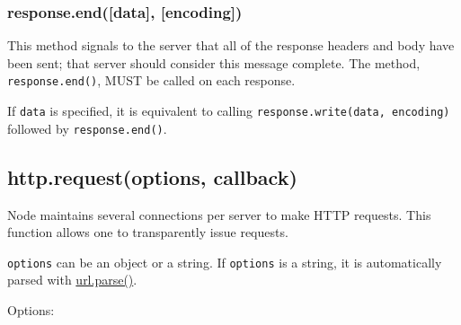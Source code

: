 \subsubsection{response.end({[}data{]}, {[}encoding{]})}

This method signals to the server that all of the response headers and
body have been sent; that server should consider this message complete.
The method, \texttt{response.end()}, MUST be called on each response.

If \texttt{data} is specified, it is equivalent to calling
\texttt{response.write(data, encoding)} followed by
\texttt{response.end()}.

\subsection{http.request(options, callback)}

Node maintains several connections per server to make HTTP requests.
This function allows one to transparently issue requests.

\texttt{options} can be an object or a string. If \texttt{options} is a
string, it is automatically parsed with
\href{url.html\#url\_url\_parse\_urlstr\_parsequerystring\_slashesdenotehost}{url.parse()}.

Options:

